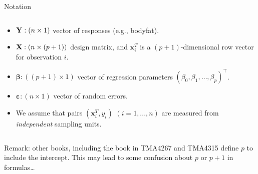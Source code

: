 \documentclass[10pt,ignorenonframetext,]{beamer}
\providecommand{\tightlist}{%
  \setlength{\itemsep}{0pt}\setlength{\parskip}{0pt}}
\begin{document}
\begin{frame}

\begin{block}{Notation}

\(~\)

\begin{itemize}
\tightlist
\item
  \({\bf Y}: (n \times 1)\) vector of responses (e.g., bodyfat).
\end{itemize}

\vspace{2mm}

\begin{itemize}
\tightlist
\item
  \({\bf X}: (n \times (p+1))\) design matrix, and
  \({\boldsymbol x}_i^T\) is a \((p+1)\)-dimensional row vector for
  observation \(i\).
\end{itemize}

\vspace{2mm}

\begin{itemize}
\tightlist
\item
  \({\boldsymbol \beta}: ((p+1) \times 1)\) vector of regression
  parameters \((\beta_0,\beta_1,\ldots,\beta_p)^\top\).
\end{itemize}

\vspace{2mm}

\begin{itemize}
\tightlist
\item
  \({\boldsymbol \varepsilon}: (n\times 1)\) vector of random errors.
\end{itemize}

\vspace{2mm}

\begin{itemize}
\tightlist
\item
  We assume that pairs \(({\boldsymbol x}_i^T,y_i)\) \((i=1,...,n)\) are
  measured from \emph{independent} sampling units.
\end{itemize}

\(~\)

Remark: other books, including the book in TMA4267 and TMA4315 define
\(p\) to include the intercept. This may lead to some confusion about
\(p\) or \(p+1\) in formulas\ldots{}

\end{block}

\end{frame}
\end{document}
